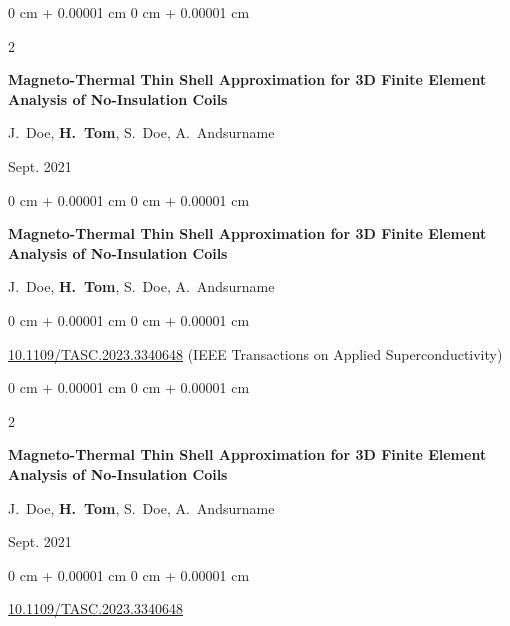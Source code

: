 \documentclass[10pt, letterpaper]{article}
\newenvironment{onecolentry}{
    \begin{adjustwidth}{
        0 cm + 0.00001 cm
    }{
        0 cm + 0.00001 cm
    }
}{
    \end{adjustwidth}
} %
\newenvironment{twocolentry}[2][]{
    \onecolentry
    \def\secondColumn{#2}
    \setcolumnwidth{\fill, 4.5 cm}
    \begin{paracol}{2}
}{
    \switchcolumn \raggedleft \secondColumn
    \end{paracol}
    \endonecolentry
} %
\begin{document}
        \vspace{0.2 cm}

        \begin{samepage}
            \begin{twocolentry}{
                Sept. 2021
            }
                \textbf{Magneto-Thermal Thin Shell Approximation for 3D Finite Element Analysis of No-Insulation Coils}

                \vspace{0.10 cm}

                \mbox{J. Doe}, \mbox{\textbf{H. Tom}}, \mbox{S. Doe}, \mbox{A. Andsurname}
            \end{twocolentry}


        \end{samepage}

        \vspace{0.2 cm}

        \begin{samepage}
            \begin{onecolentry}
                \textbf{Magneto-Thermal Thin Shell Approximation for 3D Finite Element Analysis of No-Insulation Coils}

                \vspace{0.10 cm}

                \mbox{J. Doe}, \mbox{\textbf{H. Tom}}, \mbox{S. Doe}, \mbox{A. Andsurname}
            \end{onecolentry}


            \vspace{0.10 cm}

            \begin{onecolentry}
        \href{https://doi.org/10.1109/TASC.2023.3340648}{10.1109/TASC.2023.3340648} (IEEE Transactions on Applied Superconductivity)    \end{onecolentry}
        \end{samepage}

        \vspace{0.2 cm}

        \begin{samepage}
            \begin{twocolentry}{
                Sept. 2021
            }
                \textbf{Magneto-Thermal Thin Shell Approximation for 3D Finite Element Analysis of No-Insulation Coils}

                \vspace{0.10 cm}

                \mbox{J. Doe}, \mbox{\textbf{H. Tom}}, \mbox{S. Doe}, \mbox{A. Andsurname}
            \end{twocolentry}


            \vspace{0.10 cm}

            \begin{onecolentry}
        \href{https://doi.org/10.1109/TASC.2023.3340648}{10.1109/TASC.2023.3340648}    \end{onecolentry}
        \end{samepage}
\end{document}
